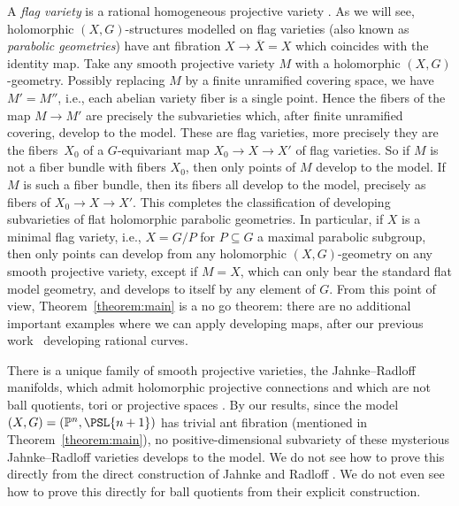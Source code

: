 \documentclass[pdftex]{sigma}
\numberwithin{equation}{section}
\renewcommand{\Proj}[1]{{\mathbb{P}^{#1}}}
\begin{document}
\begin{Example}
A \emph{flag variety} is a rational homogeneous projective variety \cite{Alekseevsky:1997}.
As we will see, holomorphic $(X, G)$-structures modelled on flag varieties (also known as \emph{parabolic geometries}) have
ant fibration $X \longrightarrow \overline{X} = X$ which coincides with the identity map.
Take any smooth projective variety $M$ with a holomorphic $(X, G)$-geometry.
Possibly replacing $M$ by a finite unramified covering space, we
have $M' = M''$, i.e., each abelian variety fiber is a single point.
Hence the fibers of the map $M\to M'$ are precisely the subvarieties which, after finite unramified covering, develop to the model.
These are flag varieties, more precisely they are the fibers~$X_0$ of a $G$-equivariant map $X_0\to X\to X'$ of flag varieties.
So if $M$ is not a fiber bundle with fibers $X_0$, then only points of $M$ develop to the model.
If $M$ is such a fiber bundle, then its fibers all develop to the model, precisely as fibers of $X_0\to X\to X'$.
This completes the classification of developing subvarieties of flat holomorphic parabolic geometries. In particular, if $X$ is
a minimal flag variety, i.e., $X = G/P$ for $P \subseteq G$ a maximal parabolic subgroup, then only points can develop from
any holomorphic $(X, G)$-geometry on any smooth projective variety, except if $M = X$, which can only bear the standard flat
model geometry, and develops to itself by any element of $G$. From this point of view, Theorem~\ref{theorem:main} is a no go
theorem: there are no additional important examples where we can apply developing maps, after our previous work~\cite{Biswas.McKay:2016} developing rational curves.
\end{Example}

\begin{Example}
There is a unique family of smooth projective varieties, the Jahnke--Radloff manifolds, which admit holomorphic projective connections and
which are not ball quotients, tori or projective spaces \cite{Jahnke/Radloff:2015}. By our results, since the model
$(X, G) = (\Proj{n}, \PSL{n+1})$ has trivial ant fibration (mentioned in Theorem~\ref{theorem:main}), no positive-dimensional
subvariety of these mysterious Jahnke--Radloff varieties develops to the model. We do not see how to prove this directly from the direct
construction of Jahnke and Radloff \cite{Jahnke/Radloff:2015}. We do not even see how to prove this directly for ball quotients from their
explicit construction.
\end{Example}
\end{document}
